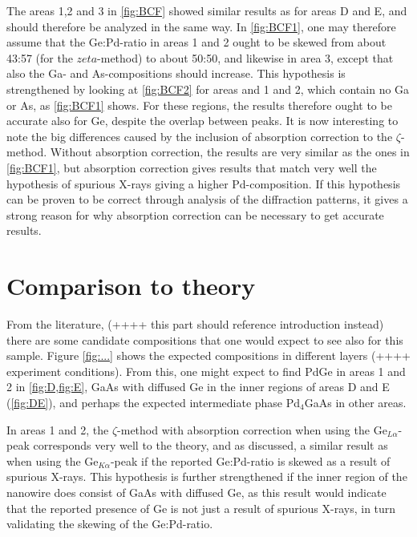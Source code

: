 The areas 1,2 and 3 in \cref{fig:BCF} showed similar results as for areas D and E, and should therefore be analyzed in the same way. In \cref{fig:BCF1}, one may therefore assume that the Ge:Pd-ratio in areas 1 and 2 ought to be skewed from about 43:57 (for the $zeta$-method) to about 50:50, and likewise in area 3, except that also the Ga- and As-compositions should increase. This hypothesis is strengthened by looking at \cref{fig:BCF2} for areas and 1 and 2, which contain no Ga or As, as \cref{fig:BCF1} shows. For these regions, the results therefore ought to be accurate also for Ge, despite the overlap between peaks. It is now interesting to note the big differences caused by the inclusion of absorption correction to the $\zeta$-method. Without absorption correction, the results are very similar as the ones in \cref{fig:BCF1}, but absorption correction gives results that match very well the hypothesis of spurious X-rays giving a higher Pd-composition. If this hypothesis can be proven to be correct through analysis of the diffraction patterns, it gives a strong reason for why absorption correction can be necessary to get accurate results.

\section{Comparison to theory}

From the literature, \cite{nanowire-theory} (++++ this part should reference introduction instead) there are some candidate compositions that one would expect to see also for this sample. Figure \cref{fig:...} shows the expected compositions in different layers (++++ experiment conditions). From this, one might expect to find PdGe in areas 1 and 2 in \cref{fig:D,fig:E}, GaAs with diffused Ge in the inner regions of areas D and E (\cref{fig:DE}), and perhaps the expected intermediate phase Pd$_4$GaAs in other areas.

In areas 1 and 2, the $\zeta$-method with absorption correction when using the Ge$_{L\alpha}$-peak corresponds very well to the theory, and as discussed, a similar result as when using the Ge$_{K\alpha}$-peak if the reported Ge:Pd-ratio is skewed as a result of spurious X-rays. This hypothesis is further strengthened if the inner region of the nanowire does consist of GaAs with diffused Ge, as this result would indicate that the reported presence of Ge is not just a result of spurious X-rays, in turn validating the skewing of the Ge:Pd-ratio.

